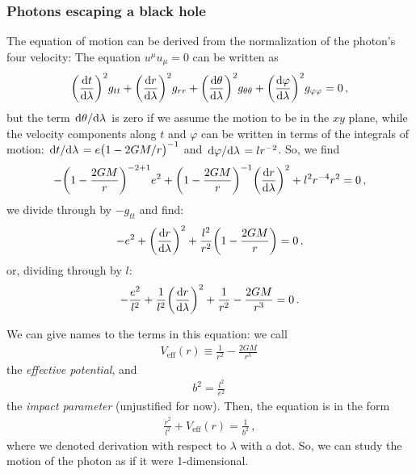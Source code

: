 \documentclass[main.tex]{subfiles}
\begin{document}
\subsubsection{Photons escaping a black hole}

The equation of motion can be derived from the normalization of the photon's four velocity: The equation \(u^{ \mu } u_{\mu }= 0 \) can be  written as 
%
\begin{align}
    \qty(\dv{t}{\lambda })^2 g_{tt} +
    \qty(\dv{r}{\lambda })^2 g_{rr} +
    \qty(\dv{\theta }{\lambda })^2 g_{\theta \theta } +
    \qty(\dv{\varphi }{\lambda })^2 g_{\varphi \varphi } = 0
\,,
\end{align}
%
but the term \(\dv*{\theta }{\lambda }\) is zero if we assume the motion to be in the \(xy \) plane, while the velocity components along \(t\) and \(\varphi \) can be written in terms of the integrals of motion: \(\dv*{t}{\lambda } = e \qty(1 - 2GM/r)^{-1}\) and \(\dv*{\varphi }{\lambda } = l r^{-2}\). So, we find 
%
\begin{align}
  - \qty(1 - \frac{2GM}{r})^{-2+1} e^2 + \qty(1 - \frac{2GM}{r})^{-1} \qty(\dv{r}{\lambda })^2 + l^2 r^{-4} r^2 = 0
\,,
\end{align}
%
we divide through by \(-g_{tt}\) and find: 
%
\begin{align}
    -e^2 + \qty(\dv{r}{\lambda })^2+ \frac{l^2}{r^2} \qty(1 - \frac{2GM}{r}) = 0
    \,,
\end{align}
%
or, dividing through by \(l\):
%
\begin{align}
    -\frac{e^2}{l^2} + \frac{1}{l^2}\qty(\dv{r}{\lambda })^2+ \frac{1}{r^2} - \frac{2GM}{r^3} = 0
\,.
\end{align}

We can give names to the terms in this equation: we call 
%
\begin{align}
  V _{\text{eff}} (r) \equiv \frac{1}{r^2} - \frac{2GM}{r^3}
\,
\end{align}
%
the \emph{effective potential}, and 
%
\begin{align}
  b^2 = \frac{l^2}{e^2}
\,
\end{align}
%
the \emph{impact parameter} (unjustified for now). Then, the equation is in the form 
%
\begin{align}
  \frac{\dot{r}^2}{l^2}  + V _{\text{eff}} (r) = \frac{1}{b^2}
\,,
\end{align}
%
where we denoted derivation with respect to \(\lambda \) with a dot. 
So, we can study the motion of the photon as if it were 1-dimensional. 
\end{document}
